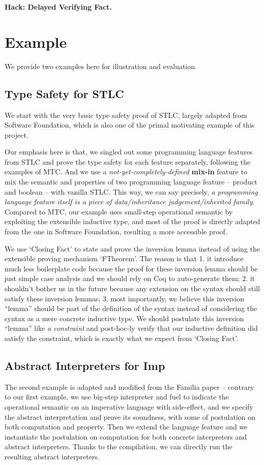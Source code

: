 \textbf{Hack: Delayed Verifying Fact.}


\section{Example}
We provide two examples here for illustration and evaluation. 

\subsection{Type Safety for STLC}
We start with the very basic type safety proof of STLC, largely adapted from Software Foundation, which is also one of the primal motivating example of this project. 

Our emphasis here is that, we singled out some programming language features from STLC and prove the type safety for each feature separately, following the examples of MTC. And we use a \textit{not-yet-completely-defined} \textbf{mix-in} feature to mix the semantic and properties of two programming language feature -- product and boolean -- with vanilla STLC. This way, we can say precisely, \textit{a programming language feature itself is a piece of data/inheritance judgement/inherited family}. Compared to MTC, our example uses small-step operational semantic by exploiting the extensible inductive type, and most of the proof is directly adapted from the one in Software Foundation, resulting a more accessible proof. 

We use `Closing Fact' to state and prove the inversion lemma instead of using the extensible proving mechanism `FTheorem'. The reason is that 1. it introduce much less boilerplate code because the proof for these inversion lemma should be just simple case analysis and we should rely on Coq to auto-generate them; 2. it shouldn't bother us in the future because any extension on the syntax should still satisfy these inversion lemmas; 3. most importantly, we believe this inversion ``lemma'' should be part of the definition of the syntax instead of considering the syntax as a mere concrete inductive type. We should postulate this inversion ``lemma'' like \textit{a constraint} and post-hoc-ly verify that our inductive definition did satisfy the constraint, which is exactly what we expect from `Closing Fact'.

\subsection{Abstract Interpreters for Imp}
The second example is adapted and modified from the Familia paper -- contrary to our first example, we use big-step interpreter and fuel to indicate the operational semantic on an imperative language with side-effect, and we specify the abstract interpretation and prove its soundness, with some of postulation on both computation and property. Then we extend the language feature and we instantiate the postulation on computation for both concrete interpreters and abstract interpreters. Thanks to the compilation, we can directly run the resulting abstract interpreters.